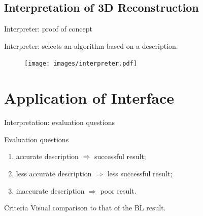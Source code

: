 \documentclass[10pt]{beamer}
\begin{document}
\subsection{Interpretation of 3D Reconstruction}
\begin{frame}{Interpreter: proof of concept}

Interpreter: selects an algorithm based on a description.

\begin{figure}[!htbp]
\centering
\texttt{[image: images/interpreter.pdf]}
\end{figure}

\end{frame}

\section{Application of Interface}
\begin{frame}{Interpretation: evaluation questions}

\begin{exampleblock}{Evaluation questions}
\begin{enumerate}
  \item accurate description $\Rightarrow$ successful result;
  \item less accurate description $\Rightarrow$ less successful result;
  \item inaccurate description $\Rightarrow$ poor result.
\end{enumerate}
\end{exampleblock}

\begin{exampleblock}{Criteria}
  Visual comparison to that of the BL result.
\end{exampleblock}

\end{frame}
\end{document}
